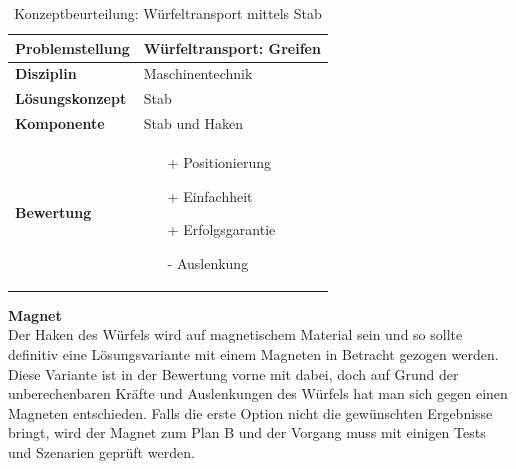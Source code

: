 \documentclass[../../../main.tex]{subfiles}
\begin{document}
\begin{flushleft}
    \begin{table}[h]
    \begin{tabular}{ | l | p{11cm} |}
    \hline
    \textbf{Problemstellung} & Würfeltransport: Greifen \\ \hline
    \textbf{Disziplin} & Maschinentechnik \\ \hline
    \textbf{Lösungskonzept} &  Stab \\ \hline
    \textbf{Komponente} & Stab und Haken \\ \hline
    \textbf{Bewertung} &  \begin{itemize}
                            \item[+] Positionierung
                            \item[+] Einfachheit
                            \item[+] Erfolgsgarantie 
                            \item[-] Auslenkung
                          \end{itemize} \\ \hline
    \end{tabular}
    \caption{Konzeptbeurteilung: Würfeltransport mittels Stab}
    \label{tab:stab}
\end{table}
\end{flushleft}

\textbf{Magnet}\\
 Der Haken des Würfels wird auf magnetischem Material sein und so sollte definitiv eine Lösungsvariante mit einem Magneten in Betracht gezogen werden. Diese Variante ist in der Bewertung vorne mit dabei, doch auf Grund der unberechenbaren Kräfte und Auslenkungen des Würfels hat man sich gegen einen Magneten entschieden. Falls die erste Option nicht die gewünschten Ergebnisse bringt, wird der Magnet zum Plan B und der Vorgang muss mit einigen Tests und Szenarien geprüft werden.
\end{document}
